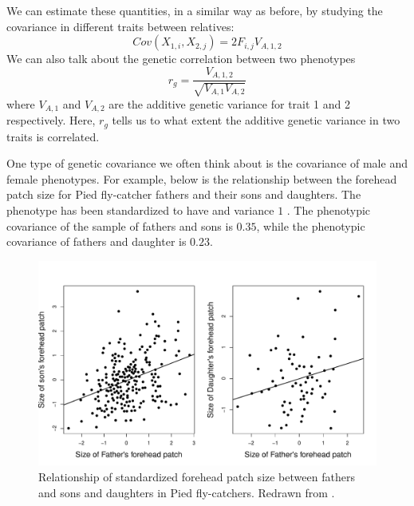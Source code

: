 We can estimate these quantities, in a similar way as before, by
studying the covariance in different traits between relatives: 
\begin{equation}
Cov(X_{1,i},X_{2,j}) = 2 F_{i,j} V_{A,1,2}
\end{equation}
We can also talk about the genetic correlation between two phenotypes
\begin{equation}
r_g = \frac{V_{A,1,2}}{\sqrt{V_{A,1}V_{A,2}}}
\end{equation}
where $V_{A,1}$ and $V_{A,2}$ are the additive genetic variance for trait 1 and 2 respectively. Here, $r_g$ tells us to what extent the additive genetic variance in two traits is correlated.   

One  type of  genetic covariance we often think about is the covariance of male and female phenotypes. For example, below is the relationship between the forehead patch size for Pied fly-catcher fathers and their sons and daughters. The phenotype has been standardized to have  and variance $1$ . The phenotypic covariance of the sample of fathers and sons is $0.35$, while the phenotypic covariance of fathers and daughter is $0.23$. 

\begin{figure}
\begin{center}
\includegraphics[width= \textwidth]{Journal_figs/Quant_gen/pied_fly_catcher_sex_genetic_corr/FlyCatcher_genetic_corr.pdf}
\end{center}
\caption{Relationship of standardized forehead patch size between
  fathers and sons and daughters in  Pied fly-catchers. Redrawn from \citeauthor{potti:11}.} \label{fig:FlyCatcher_genetic_corr}   %
\end{figure}

